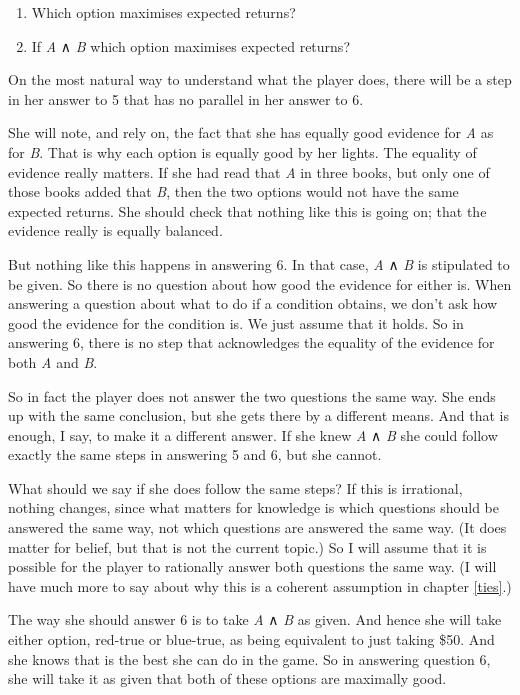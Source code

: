 \documentclass[
  11pt,
]{book}
\providecommand{\tightlist}{%
  \setlength{\itemsep}{0pt}\setlength{\parskip}{0pt}}
\begin{document}
\begin{enumerate}
\def\labelenumi{\arabic{enumi}.}
\setcounter{enumi}{4}
\tightlist
\item
  Which option maximises expected returns?
\item
  If \emph{A} ∧ \emph{B} which option maximises expected returns?
\end{enumerate}

On the most natural way to understand what the player does, there will be a step in her answer to 5 that has no parallel in her answer to 6.

She will note, and rely on, the fact that she has equally good evidence for \emph{A} as for \emph{B}. That is why each option is equally good by her lights. The equality of evidence really matters. If she had read that \emph{A} in three books, but only one of those books added that \emph{B}, then the two options would not have the same expected returns. She should check that nothing like this is going on; that the evidence really is equally balanced.

But nothing like this happens in answering 6. In that case, \emph{A} ∧ \emph{B} is stipulated to be given. So there is no question about how good the evidence for either is. When answering a question about what to do if a condition obtains, we don't ask how good the evidence for the condition is. We just assume that it holds. So in answering 6, there is no step that acknowledges the equality of the evidence for both \emph{A} and \emph{B}.

So in fact the player does not answer the two questions the same way. She ends up with the same conclusion, but she gets there by a different means. And that is enough, I say, to make it a different answer. If she knew \emph{A} ∧ \emph{B} she could follow exactly the same steps in answering 5 and 6, but she cannot.

What should we say if she does follow the same steps? If this is irrational, nothing changes, since what matters for knowledge is which questions should be answered the same way, not which questions are answered the same way. (It does matter for belief, but that is not the current topic.) So I will assume that it is possible for the player to rationally answer both questions the same way. (I will have much more to say about why this is a coherent assumption in chapter \ref{ties}.)

The way she should answer 6 is to take \emph{A} ∧ \emph{B} as given. And hence she will take either option, red-true or blue-true, as being equivalent to just taking \$50. And she knows that is the best she can do in the game. So in answering question 6, she will take it as given that both of these options are maximally good.
\end{document}

